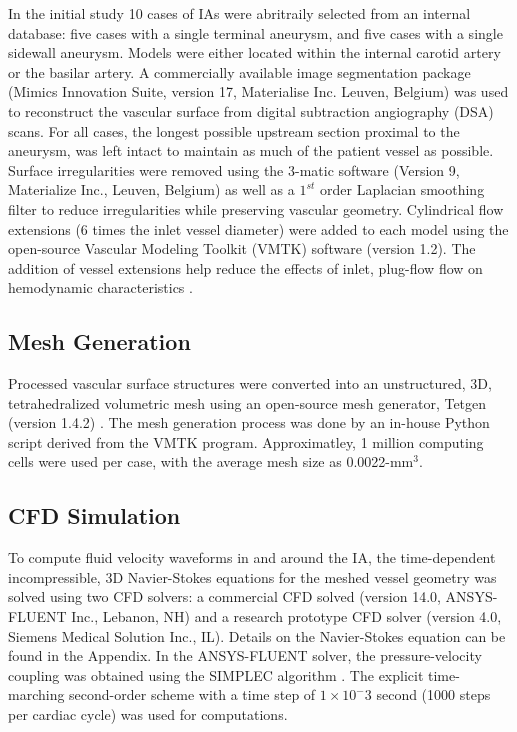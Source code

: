 In the initial study 10 cases of IAs were abritraily selected from an internal database: five cases with a single terminal aneurysm, and five cases with a single sidewall aneurysm. Models were either located within the internal carotid artery or the basilar artery. A commercially available image segmentation package (Mimics Innovation Suite, version 17, Materialise Inc. Leuven, Belgium) was used to reconstruct the vascular surface from digital subtraction angiography (DSA) scans. For all cases, the longest possible upstream section proximal to the aneurysm, was left intact to maintain as much of the patient vessel as possible. Surface irregularities were removed using the 3-matic software (Version 9, Materialize Inc., Leuven, Belgium) as well as a $1^{st}$ order Laplacian smoothing filter to reduce irregularities while preserving vascular geometry. Cylindrical flow extensions (6 times the inlet vessel diameter) were added to each model using the open-source Vascular Modeling Toolkit (VMTK) software (version 1.2). The addition of vessel extensions help reduce the effects of inlet, plug-flow flow on hemodynamic characteristics \cite{poethke2009cerebral}.

\subsection{Mesh Generation}\label{CHAPTER2_SECTION1_SUBSECTION2}
Processed vascular surface structures were converted into an unstructured, 3D, tetrahedralized volumetric mesh using an open-source mesh generator, Tetgen (version 1.4.2) \cite{si20113d}. The mesh generation process was done by an in-house Python script derived from the VMTK program. Approximatley, 1 million computing cells were used per case, with the average mesh size as 0.0022-mm$^{3}$.

\subsection{CFD Simulation}\label{CHAPTER2_SECTION1_SUBSECTION3}
To compute fluid velocity waveforms in and around the IA, the time-dependent incompressible, 3D Navier-Stokes equations for the meshed vessel geometry was solved using two CFD solvers: a commercial CFD solved (version 14.0, ANSYS-FLUENT Inc., Lebanon, NH) and a research prototype CFD solver (version 4.0, Siemens Medical Solution Inc., IL). Details on the Navier-Stokes equation can be found in the Appendix.  In the ANSYS-FLUENT solver, the pressure-velocity coupling was obtained using the SIMPLEC algorithm \cite{versteeg2007introduction}. The explicit time-marching second-order scheme with a time step of $1\times 10^-3$ second (1000 steps per cardiac cycle) was used for computations.

